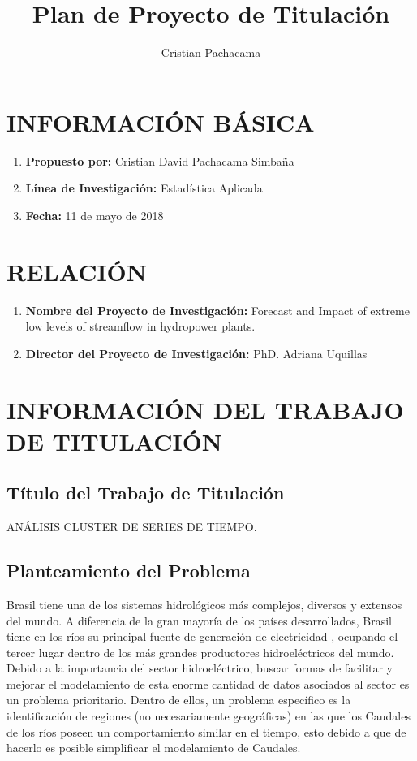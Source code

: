 \documentclass[10pt,a5paper]{article}
\author{Cristian Pachacama}
\title{Plan de Proyecto de Titulación}
\begin{document}
\maketitle
\section{INFORMACIÓN BÁSICA}


\begin{enumerate}

\item \textbf{Propuesto por:} Cristian David Pachacama Simbaña
\item \textbf{Línea de Investigación:} Estadística Aplicada
\item \textbf{Fecha:} 11 de mayo de 2018

\end{enumerate}

\section{RELACIÓN}

\begin{enumerate}

\item \textbf{Nombre del Proyecto de Investigación:} Forecast and Impact of extreme low levels of streamflow in hydropower plants.
\item \textbf{Director del Proyecto de Investigación:} PhD. Adriana Uquillas

\end{enumerate}


\section{INFORMACIÓN DEL TRABAJO DE TITULACIÓN}

\subsection{Título del Trabajo de Titulación}

ANÁLISIS CLUSTER DE SERIES DE TIEMPO.

\subsection{Planteamiento del Problema}
Brasil tiene una de los sistemas hidrológicos más complejos, diversos y extensos del mundo. A diferencia de la gran mayoría de los países desarrollados, Brasil tiene en los ríos su principal fuente de generación de electricidad , ocupando el tercer lugar dentro de los más grandes productores hidroeléctricos del mundo. Debido a la importancia del sector hidroeléctrico, buscar formas de facilitar y mejorar el modelamiento de esta enorme cantidad de datos asociados al sector es un problema prioritario. 
Dentro de ellos, un problema específico es la identificación de regiones (no necesariamente geográficas) en las que los Caudales de los ríos poseen un comportamiento similar en el tiempo, esto debido a que de hacerlo es posible simplificar el modelamiento de Caudales.
\end{document}
